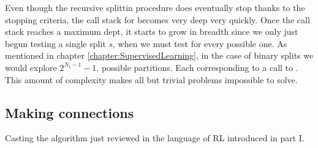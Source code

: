 Even though the recursive splittin procedure does eventually stop thanks to the
stopping criteria, the call stack for \TrueBestSplit becomes very deep very
quickly. Once the call stack reaches a maximum dept, it starts to grow in
breadth since we only just begun testing a single split $s$, when we must test
for every possible one. As mentioned in chapter
\ref{chapter:SupervisedLearning}, in the case of binary splits we would explore
$2^{N_t -1}-1$, possible partitions. Each corresponding to a call to
\TrueBestSplit. This amount of complexity makes all but trivial problems
impossible to solve. 

\subsection{Making connections}

Casting the algorithm just reviewed in the language of RL introduced in part I.